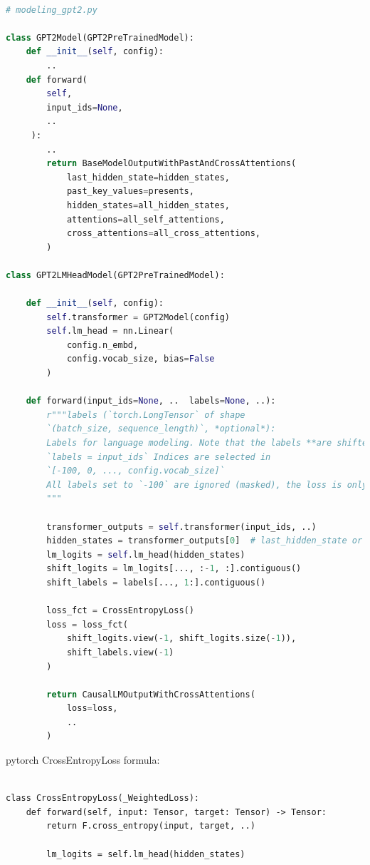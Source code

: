 \begin{lstlisting}[language=Python]

# modeling_gpt2.py

class GPT2Model(GPT2PreTrainedModel):
    def __init__(self, config):
    	..
    def forward(
	    self,
	    input_ids=None,	
	    ..
	 ):
	 	..
	 	return BaseModelOutputWithPastAndCrossAttentions(
		 	last_hidden_state=hidden_states,
		 	past_key_values=presents,
		 	hidden_states=all_hidden_states,
		 	attentions=all_self_attentions,
		 	cross_attentions=all_cross_attentions,
	 	)

class GPT2LMHeadModel(GPT2PreTrainedModel):	

	def __init__(self, config):
		self.transformer = GPT2Model(config)
		self.lm_head = nn.Linear(
			config.n_embd, 
			config.vocab_size, bias=False
		)
	
	def forward(input_ids=None, ..	labels=None, ..):
		r"""labels (`torch.LongTensor` of shape 
		`(batch_size, sequence_length)`, *optional*):
		Labels for language modeling. Note that the labels **are shifted** inside the model, i.e. you can set
		`labels = input_ids` Indices are selected in 
		`[-100, 0, ..., config.vocab_size]` 
		All labels set to `-100` are ignored (masked), the loss is only computed for labels in `[0, ..., config.vocab_size]`
		"""
		
		transformer_outputs = self.transformer(input_ids, ..)
		hidden_states = transformer_outputs[0]  # last_hidden_state or hidden_states?
		lm_logits = self.lm_head(hidden_states)
		shift_logits = lm_logits[..., :-1, :].contiguous()
		shift_labels = labels[..., 1:].contiguous()
		
		loss_fct = CrossEntropyLoss()
		loss = loss_fct(
			shift_logits.view(-1, shift_logits.size(-1)), 
			shift_labels.view(-1)
		)
	
		return CausalLMOutputWithCrossAttentions(
			loss=loss,
			..
		)
\end{lstlisting}


pytorch CrossEntropyLoss formula:

\begin{lstlisting}
	
class CrossEntropyLoss(_WeightedLoss):
	def forward(self, input: Tensor, target: Tensor) -> Tensor:
		return F.cross_entropy(input, target, ..)
		
		lm_logits = self.lm_head(hidden_states)
\end{lstlisting}

